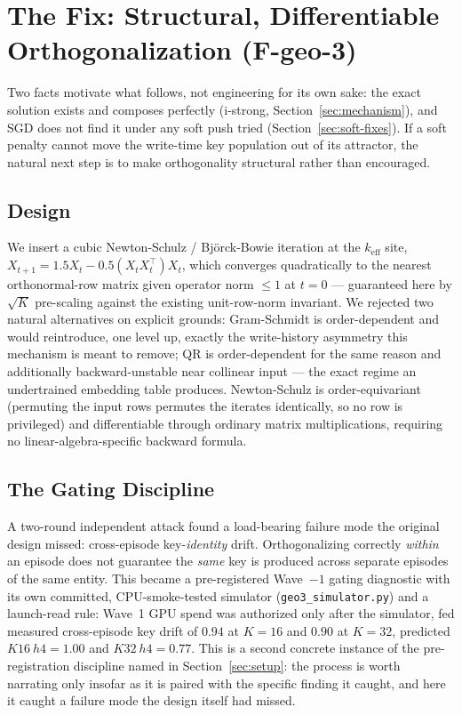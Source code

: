 \section{The Fix: Structural, Differentiable Orthogonalization (F-geo-3)}
\label{sec:the-fix}


Two facts motivate what follows, not engineering for its own sake: the
exact solution exists and composes perfectly (i-strong,
Section~\ref{sec:mechanism}), and SGD does not find it under any soft
push tried (Section~\ref{sec:soft-fixes}). If a soft penalty cannot move
the write-time key population out of its attractor, the natural next
step is to make orthogonality structural rather than encouraged.

\subsection{Design}

We insert a cubic Newton-Schulz / Bj\"orck-Bowie iteration at the
$k_{\mathrm{eff}}$ site, $X_{t+1} = 1.5X_t - 0.5(X_tX_t^\top)X_t$, which
converges quadratically to the nearest orthonormal-row matrix given
operator norm $\leq1$ at $t{=}0$ --- guaranteed here by $\sqrt{K}$
pre-scaling against the existing unit-row-norm invariant. We rejected two
natural alternatives on explicit grounds: Gram-Schmidt is order-dependent
and would reintroduce, one level up, exactly the write-history asymmetry
this mechanism is meant to remove; QR is order-dependent for the same
reason and additionally backward-unstable near collinear input --- the
exact regime an undertrained embedding table produces. Newton-Schulz is
order-equivariant (permuting the input rows permutes the iterates
identically, so no row is privileged) and differentiable through ordinary
matrix multiplications, requiring no linear-algebra-specific backward
formula.

\subsection{The Gating Discipline}

A two-round independent attack found a load-bearing failure mode the
original design missed: cross-episode key-\emph{identity} drift.
Orthogonalizing correctly \emph{within} an episode does not guarantee the
\emph{same} key is produced across separate episodes of the same entity.
This became a pre-registered Wave~$-1$ gating diagnostic with its own
committed, CPU-smoke-tested simulator (\texttt{geo3\_simulator.py}) and a
launch-read rule: Wave~1 GPU spend was authorized only after the
simulator, fed measured cross-episode key drift of $0.94$ at $K{=}16$
and $0.90$ at $K{=}32$, predicted $K16\ h4{=}1.00$ and $K32\
h4{=}0.77$. This is a second concrete instance of the pre-registration
discipline named in Section~\ref{sec:setup}: the process is worth
narrating only insofar as it is paired with the specific finding it
caught, and here it caught a failure mode the design itself had missed.

